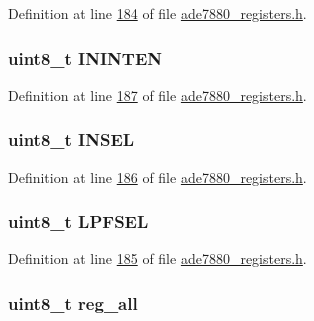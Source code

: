 Definition at line \hyperlink{a00036_source_l00184}{184} of file \hyperlink{a00036_source}{ade7880\-\_\-registers.\-h}.

\hypertarget{a00023_ab585d8beeb312dbb41d7485d5f707368}{
\subsubsection[{I\-N\-I\-N\-T\-E\-N}]{\setlength{\rightskip}{0pt plus 5cm}uint8\-\_\-t I\-N\-I\-N\-T\-E\-N}}\label{d3/d52/a00023_ab585d8beeb312dbb41d7485d5f707368}


Definition at line \hyperlink{a00036_source_l00187}{187} of file \hyperlink{a00036_source}{ade7880\-\_\-registers.\-h}.

\hypertarget{a00023_a3780db4512858d880503585a96f823a6}{
\subsubsection[{I\-N\-S\-E\-L}]{\setlength{\rightskip}{0pt plus 5cm}uint8\-\_\-t I\-N\-S\-E\-L}}\label{d3/d52/a00023_a3780db4512858d880503585a96f823a6}


Definition at line \hyperlink{a00036_source_l00186}{186} of file \hyperlink{a00036_source}{ade7880\-\_\-registers.\-h}.

\hypertarget{a00023_ac6b65abbac3f8c1f93faa0fc9930f999}{
\subsubsection[{L\-P\-F\-S\-E\-L}]{\setlength{\rightskip}{0pt plus 5cm}uint8\-\_\-t L\-P\-F\-S\-E\-L}}\label{d3/d52/a00023_ac6b65abbac3f8c1f93faa0fc9930f999}


Definition at line \hyperlink{a00036_source_l00185}{185} of file \hyperlink{a00036_source}{ade7880\-\_\-registers.\-h}.

\hypertarget{a00023_ab2957613fa7f241407cc98e80676dccf}{
\subsubsection[{reg\-\_\-all}]{\setlength{\rightskip}{0pt plus 5cm}uint8\-\_\-t reg\-\_\-all}}\label{d3/d52/a00023_ab2957613fa7f241407cc98e80676dccf}


